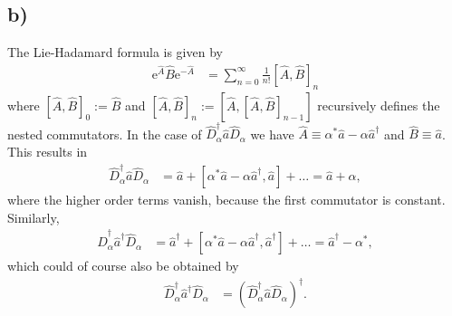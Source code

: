 \documentclass[english, parskip=full]{scrartcl}
\newcommand{\kla}{}
\newcommand{\klam}{}
\newcommand{\e}{\text{e}}
\begin{document}
\subsection*{b)}
The Lie-Hadamard formula is given by
\begin{align}
\e^{\hat{A}}\hat{B}\e^{-\hat{A}}&=\sum_{n=0}^\infty\frac{1}{n!}\klam\left[ \hat{A}, \hat{B} \right]_n
\end{align}
where $\klam\left[ \hat{A}, \hat{B} \right]_0:=\hat{B}$ and $\klam\left[ \hat{A}, \hat{B} \right]_n:=\klam\left[ \hat{A}, \klam\left[ \hat{A}, \hat{B} \right]_{n-1} \right]$ recursively defines the nested commutators.
In the case of $\hat{D}_\alpha^\dagger \hat{a}\hat{D}_\alpha$ we have $\hat{A}\equiv \alpha^\ast\hat{a} - \alpha\hat{a}^\dagger$ and $\hat{B}\equiv\hat{a}$.
This results in
\begin{align}
\hat{D}_\alpha^\dagger \hat{a}\hat{D}_\alpha &= \hat{a} + \klam\left[ \alpha^\ast\hat{a} - \alpha\hat{a}^\dagger, \hat{a} \right]+\dots=\hat{a} + \alpha,
\end{align}
where the higher order terms vanish, because the first commutator is constant.
Similarly,
\begin{align}
\hat{D}_\alpha^\dagger \hat{a}^\dagger\hat{D}_\alpha &= \hat{a}^\dagger + \klam\left[ \alpha^\ast\hat{a} - \alpha\hat{a}^\dagger, \hat{a}^\dagger \right]+\dots=\hat{a}^\dagger - \alpha^\ast,
\end{align}
which could of course also be obtained by
\begin{align}
\hat{D}_\alpha^\dagger \hat{a}^\dagger\hat{D}_\alpha &= \kla\left( \hat{D}_\alpha^\dagger \hat{a}\hat{D}_\alpha  \right)^\dagger.
\end{align}
\end{document}
